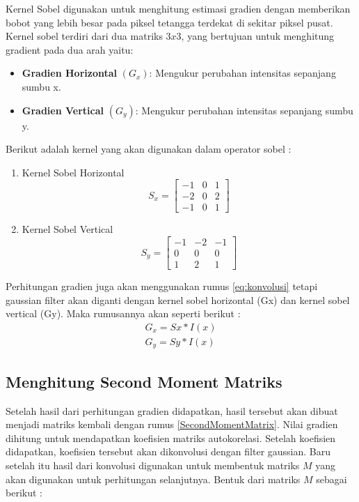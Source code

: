     Kernel Sobel digunakan untuk menghitung estimasi gradien dengan memberikan bobot yang lebih besar pada piksel tetangga terdekat di sekitar piksel pusat.
Kernel sobel terdiri dari dua matriks \(3 x 3\), yang bertujuan untuk menghitung gradient pada dua arah yaitu:
 \begin{itemize}
    \item \textbf{Gradien Horizontal} \((G_{x})\): Mengukur perubahan intensitas sepanjang sumbu x.
    \item \textbf{Gradien Vertical} \((G_{y})\): Mengukur perubahan intensitas sepanjang sumbu y.
\end{itemize}
    Berikut adalah kernel yang akan digunakan dalam operator sobel :
\begin{enumerate}
    \item Kernel Sobel Horizontal
    \begin{equation*}
        S_{x} = 
        \begin{bmatrix}
            -1 & 0 & 1 \\
            -2 & 0 & 2 \\
            -1 & 0 & 1
          \end{bmatrix}
    \end{equation*}

    \item  Kernel Sobel Vertical
    \begin{equation*}
        S_{y} = 
        \begin{bmatrix}
            -1 & -2 & -1 \\
            0 & 0 & 0 \\
            1 & 2 & 1
          \end{bmatrix}
    \end{equation*}

\end{enumerate}
Perhitungan gradien juga akan menggunakan rumus \eqref{eq:konvolusi} tetapi gaussian filter akan diganti dengan kernel sobel horizontal (Gx) dan kernel sobel vertical (Gy).
Maka rumusannya akan seperti berikut :
\begin{equation}
    \begin{aligned}
        G_{x} = Sx * I(x)\\ G_{y} = Sy * I(x)
    \end{aligned}
\end{equation}


\subsection{Menghitung Second Moment Matriks}
    Setelah hasil dari perhitungan gradien didapatkan, hasil tersebut akan dibuat menjadi matriks kembali dengan rumus \eqref{SecondMomentMatrix}. Nilai gradien dihitung untuk mendapatkan koefisien matriks autokorelasi. Setelah koefisien didapatkan, koefisien tersebut akan dikonvolusi dengan filter gaussian.
Baru setelah itu hasil dari konvolusi digunakan untuk membentuk matriks \(M\) yang akan digunakan untuk perhitungan selanjutnya. Bentuk dari matriks \(M\) sebagai berikut :

